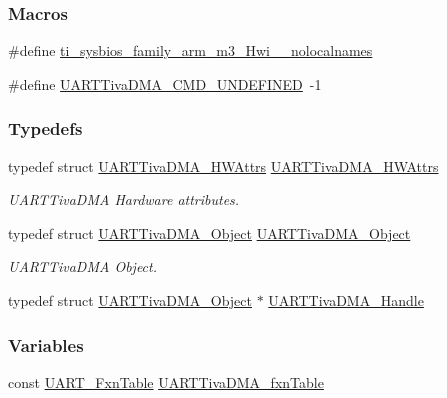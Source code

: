 \subsubsection*{Macros}
\begin{DoxyCompactItemize}
\item 
\#define \hyperlink{_u_a_r_t_tiva_d_m_a_8h_aaa17ecf48f5762e2e1bdb0bab8aacf0c}{ti\-\_\-sysbios\-\_\-family\-\_\-arm\-\_\-m3\-\_\-\-Hwi\-\_\-\-\_\-nolocalnames}
\item 
\#define \hyperlink{_u_a_r_t_tiva_d_m_a_8h_aef4c4d7ea3c5cf189518ccc8f551b328}{U\-A\-R\-T\-Tiva\-D\-M\-A\-\_\-\-C\-M\-D\-\_\-\-U\-N\-D\-E\-F\-I\-N\-E\-D}~-\/1
\end{DoxyCompactItemize}
\subsubsection*{Typedefs}
\begin{DoxyCompactItemize}
\item 
typedef struct \hyperlink{struct_u_a_r_t_tiva_d_m_a___h_w_attrs}{U\-A\-R\-T\-Tiva\-D\-M\-A\-\_\-\-H\-W\-Attrs} \hyperlink{_u_a_r_t_tiva_d_m_a_8h_a62a00b7172f6bfef1637841c7c126627}{U\-A\-R\-T\-Tiva\-D\-M\-A\-\_\-\-H\-W\-Attrs}
\begin{DoxyCompactList}\small\item\em U\-A\-R\-T\-Tiva\-D\-M\-A Hardware attributes. \end{DoxyCompactList}\item 
typedef struct \hyperlink{struct_u_a_r_t_tiva_d_m_a___object}{U\-A\-R\-T\-Tiva\-D\-M\-A\-\_\-\-Object} \hyperlink{_u_a_r_t_tiva_d_m_a_8h_ae68f92de73a22b2cdb1359930e949fc4}{U\-A\-R\-T\-Tiva\-D\-M\-A\-\_\-\-Object}
\begin{DoxyCompactList}\small\item\em U\-A\-R\-T\-Tiva\-D\-M\-A Object. \end{DoxyCompactList}\item 
typedef struct \hyperlink{struct_u_a_r_t_tiva_d_m_a___object}{U\-A\-R\-T\-Tiva\-D\-M\-A\-\_\-\-Object} $\ast$ \hyperlink{_u_a_r_t_tiva_d_m_a_8h_ad1591b2fa5d54f24f2acf1920788b015}{U\-A\-R\-T\-Tiva\-D\-M\-A\-\_\-\-Handle}
\end{DoxyCompactItemize}
\subsubsection*{Variables}
\begin{DoxyCompactItemize}
\item 
const \hyperlink{struct_u_a_r_t___fxn_table}{U\-A\-R\-T\-\_\-\-Fxn\-Table} \hyperlink{_u_a_r_t_tiva_d_m_a_8h_a05f21c1bf87357c509b7fca956223141}{U\-A\-R\-T\-Tiva\-D\-M\-A\-\_\-fxn\-Table}
\end{DoxyCompactItemize}


